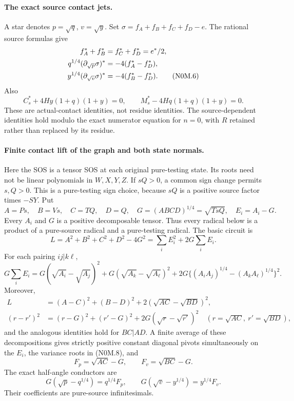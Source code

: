\paragraph{The exact source contact jets.}
A star denotes $p=\sqrt q$, $v=\sqrt y$. Set
$\sigma=f_A+f_B+f_C+f_D-e$. The rational source formulas give
\begin{align}
 f_A^*+f_B^*&=f_C^*+f_D^*=e^*/2,\notag\\
 q^{1/4}(\partial_{\sqrt p}\sigma)^*
   &=-4(f_A^*-f_D^*),\notag\\
 y^{1/4}(\partial_{\sqrt v}\sigma)^*
   &=-4(f_B^*-f_D^*).                              \tag{N0M.6}
\end{align}
Also
\[
 C_s^*+4Hy(1+q)(1+y)=0,\qquad
 M_s^*-4Hq(1+q)(1+y)=0.                           \tag{N0M.7}
\]
These are actual-contact identities, not residue identities. The source-dependent identities hold modulo the exact numerator equation
for $n=0$, with $R$ retained rather than replaced by its residue.

\paragraph{Finite contact lift of the graph and both state normals.}
Here the SOS is a tensor SOS at each original pure-testing state. Its
roots need not be linear polynomials in $W,X,Y,Z$. If $sQ>0$, a common
sign change permits $s,Q>0$. This is a pure-testing sign choice, because
$sQ$ is a positive source factor times $-SY$. Put
\[
 A=Ps,\quad B=Vs,\quad C=TQ,\quad D=Q,
 \quad G=(ABCD)^{1/4}=\sqrt{TsQ},\quad E_i=A_i-G.
\]
Every $A_i$ and $G$ is a positive decomposable tensor. Thus every radical
below is a product of a pure-source radical and a pure-testing radical.
The basic circuit is
\[
 L=A^2+B^2+C^2+D^2-4G^2
   =\sum_iE_i^2+2G\sum_iE_i.                     \tag{N0M.8}
\]
For each pairing $ij|k\ell$,
\[
 G\sum_iE_i=G(\sqrt{A_i}-\sqrt{A_j})^2
 +G(\sqrt{A_k}-\sqrt{A_\ell})^2
 +2G\{(A_iA_j)^{1/4}-(A_kA_\ell)^{1/4}\}^2.
\]
Moreover,
\begin{align*}
 L&=(A-C)^2+(B-D)^2+2(\sqrt{AC}-\sqrt{BD})^2,\\
 (r-r')^2&=(r-G)^2+(r'-G)^2
             +2G(\sqrt r-\sqrt{r'})^2
 \quad(r=\sqrt{AC},\ r'=\sqrt{BD}),
\end{align*}
and the analogous identities hold for $BC|AD$. A finite average of
these decompositions gives strictly positive constant diagonal pivots
simultaneously on the $E_i$, the variance roots in (N0M.8), and
\[
 F_p=\sqrt{AC}-G,\qquad F_v=\sqrt{BC}-G.
\]
The exact half-angle conductors are
\[
 G(\sqrt p-q^{1/4})=q^{1/4}F_p,
 \qquad G(\sqrt v-y^{1/4})=y^{1/4}F_v.          \tag{N0M.9}
\]
Their coefficients are pure-source infinitesimals.

